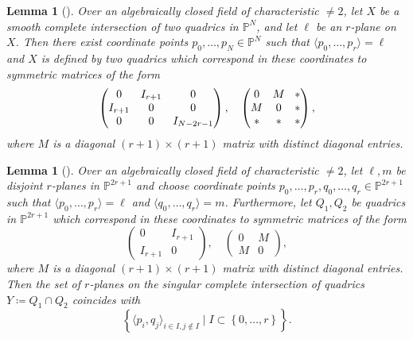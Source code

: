 \documentclass[JEP,XML,SOM,Unicode,NoEqCountersInSection,published]{cedram}
\theoremstyle{plain}
\newtheorem{lem}[thm]{Lemma}
\theoremstyle{definition}
\renewcommand\P{\mathbb{P}}
\begin{document}
\begin{lem}[{\cite[Lem.\,2.2]{Reid-thesis}}]\label{lem:reid_1}
Over an algebraically closed field of characteristic $\neq 2$, let $X$ be a smooth complete intersection of two quadrics in $\P^N$, and let $\ell$ be an $r$-plane on $X$.
Then there exist coordinate points $p_0,\dots, p_N\in \P^N$ such that $\langle p_0,\dots, p_r\rangle =\ell$ and $X$ is defined by two quadrics which correspond in these coordinates to symmetric matrices of the form\vspace*{-3pt}
\[
\begin{pmatrix}
0 & I_{r+1} & 0\\
I_{r+1} & 0 & 0\\
0 & 0 & I_{N-2r-1}
\end{pmatrix}, \quad\arraycolsep4.5pt
\begin{pmatrix}
0 & M & *\\
M & 0 & *\\
* & * & *
\end{pmatrix},
\]
where $M$ is a diagonal \((r+1)\times(r+1)\) matrix with distinct diagonal entries.
\end{lem}

\begin{lem}[{\cite[Lem.\,3.4]{Reid-thesis}}]\label{lem:reid_2}
Over an algebraically closed field of characteristic $\neq 2$, let $\ell, m$ be disjoint $r$-planes in $\P^{2r+1}$
and choose coordinate points $p_0,\dots, p_r, q_0,\dots, q_r\in \P^{2r+1}$ such that $\langle p_0,\dots,p_r\rangle=\ell$ and $\langle q_0,\dots, q_r\rangle =m$.
Furthermore, let $Q_1, Q_2$ be quadrics in $\P^{2r+1}$ which correspond in these coordinates to symmetric matrices of the form
\[
\begin{pmatrix}
0 & I_{r+1}\\
I_{r+1} & 0
\end{pmatrix}, \quad
\begin{pmatrix}
0 & M\\
M & 0
\end{pmatrix},
\]
where $M$ is a diagonal \((r+1)\times(r+1)\) matrix with distinct diagonal entries.
Then the set of $r$-planes on the singular complete intersection of quadrics $Y \coloneqq Q_1\cap Q_2$ coincides with
\[
\left\{\langle p_i, q_j\rangle_{i\in I, j\not\in I}\mid I\subset \left\{0,\dots, r\right\}
\right\}.
\]
\end{lem}
\end{document}
